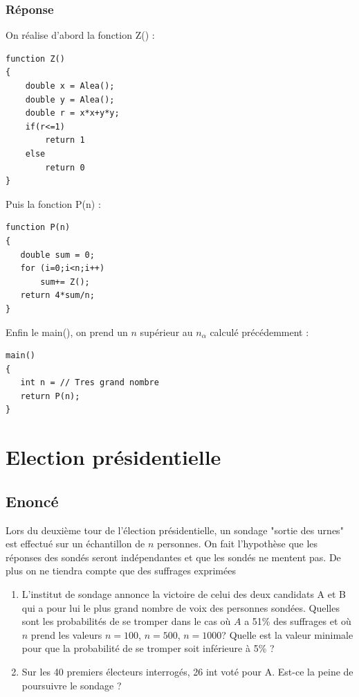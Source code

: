 \documentclass[10pt,a4paper,twoside]{article}
\begin{document}
\subsubsection*{Réponse}
On réalise d'abord la fonction Z() :
\begin{verbatim}
function Z()
{
    double x = Alea();
    double y = Alea();
    double r = x*x+y*y;
    if(r<=1)
        return 1
    else
        return 0
}
\end{verbatim}
Puis la fonction P(n) :
\begin{verbatim}
function P(n)
{
   double sum = 0;
   for (i=0;i<n;i++)
       sum+= Z();
   return 4*sum/n;
}
\end{verbatim}
Enfin le main(), on prend un $n$ supérieur au $n_{\alpha}$ calculé précédemment : 
\begin{verbatim}
main()
{
   int n = // Tres grand nombre
   return P(n);
}
\end{verbatim}

\section{Election présidentielle}
\subsection*{Enoncé}
Lors du deuxième tour de l'élection présidentielle, un sondage "sortie des urnes" est effectué sur un échantillon de $n$ personnes. On fait l'hypothèse que les réponses des sondés seront indépendantes et que les sondés ne mentent pas. De plus on ne tiendra compte que des suffrages exprimées
\begin{enumerate}
\item L'institut de sondage annonce la victoire de celui des deux candidats A et B qui a pour lui le plus grand nombre de voix des personnes sondées. Quelles sont les probabilités de se tromper dans le cas où $A$ a 51\% des suffrages et où $n$ prend les valeurs $n=100$, $n=500$, $n=1000$? Quelle est la valeur minimale pour que la probabilité de se tromper soit inférieure à 5\% ?
\item Sur les 40 premiers électeurs interrogés, 26 int voté pour A. Est-ce la peine de poursuivre le sondage ?
\end{enumerate}
\end{document}
